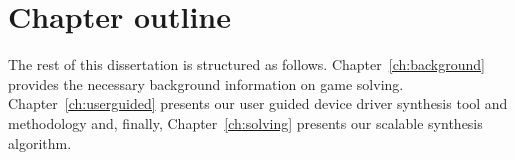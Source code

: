 \section{Chapter outline}

The rest of this dissertation is structured as follows. Chapter~\ref{ch:background} provides the necessary background information on game solving. Chapter~\ref{ch:userguided} presents our user guided device driver synthesis tool and methodology and, finally, Chapter~\ref{ch:solving} presents our scalable synthesis algorithm.
